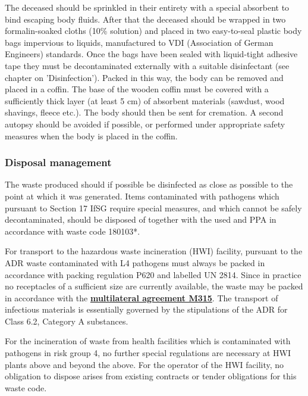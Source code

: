 \documentclass{article}
\begin{document}
The deceased should be sprinkled in their entirety with a special absorbent to bind escaping body fluids. After that the deceased should be wrapped in two formalin-soaked cloths (10\% solution) and placed in two easy-to-seal plastic body bags impervious to liquids, manufactured to VDI (Association of German Engineers) standards. Once the bags have been sealed with liquid-tight adhesive tape they must be decontaminated externally with a suitable disinfectant (see chapter on 'Disinfection'). Packed in this way, the body can be removed and placed in a coffin. The base of the wooden coffin must be covered with a sufficiently thick layer (at least 5 cm) of absorbent materials (sawdust, wood shavings, fleece etc.). The body should then be sent for cremation. A second autopsy should be avoided if possible, or performed under appropriate safety measures when the body is placed in the coffin.


\subsubsection{Disposal management}\label{H2261545}



The waste produced should if possible be disinfected as close as possible to the point at which it was generated. Items contaminated with pathogens which pursuant to Section 17 IfSG require special measures, and which cannot be safely decontaminated, should be disposed of together with the used and PPA in accordance with waste code 180103*.


For transport to the hazardous waste incineration (HWI) facility, pursuant to the ADR waste contaminated with L4 pathogens must always be packed in accordance with packing regulation P620 and labelled UN 2814. Since in practice no receptacles of a sufficient size are currently available, the waste may be packed in accordance with the \textbf{\href{https://www.rki.de/DE/Content/InfAZ/E/Ebola/Muster_Verpackungsanleitung.pdf}{multilateral agreement M315}}. The transport of infectious materials is essentially governed by the stipulations of the ADR for Class 6.2, Category A substances.


For the incineration of waste from health facilities which is contaminated with pathogens in risk group 4, no further special regulations are necessary at HWI plants above and beyond the above. For the operator of the HWI facility, no obligation to dispose arises from existing contracts or tender obligations for this waste code.
\end{document}
